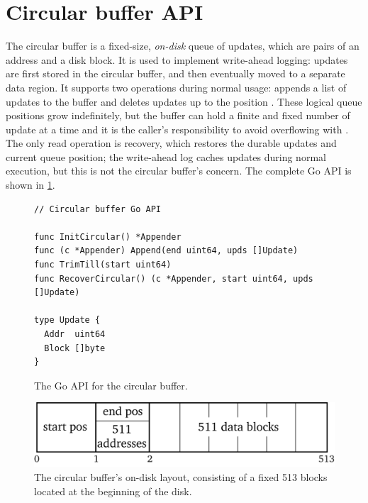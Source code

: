 \section{Circular buffer API}
\label{sec:circ-api}

The circular buffer is a fixed-size, \emph{on-disk} queue of
updates, which are pairs of an address and a disk block. It is used to implement
write-ahead logging: updates are first stored in the circular buffer, and
then eventually moved to a separate data region. It supports two operations
during normal usage:  appends a list of updates to the buffer
and  deletes updates up to the position . These logical queue positions grow
indefinitely, but the buffer can hold a finite and fixed number of update at a time and it
is the caller's responsibility to avoid overflowing with . The only
read operation is recovery, which restores the durable updates and current queue
position; the write-ahead log caches updates during normal execution, but this
is not the circular buffer's concern. The complete Go API is shown in
\cref{fig:circ:api}.

\begin{figure}[ht]
\begin{verbatim}
// Circular buffer Go API

func InitCircular() *Appender
func (c *Appender) Append(end uint64, upds []Update)
func TrimTill(start uint64)
func RecoverCircular() (c *Appender, start uint64, upds []Update)

type Update {
  Addr  uint64
  Block []byte
}
\end{verbatim}
  \tightenspace
  \caption{The Go API for the circular buffer.}%
  \label{fig:circ:api}
\end{figure}

\begin{figure}[ht]
  \includegraphics{fig/circ-phys.png}
  \caption[Circular buffer on-disk layout]%
  {The circular buffer's on-disk layout, consisting of a fixed 513 blocks
  located at the beginning of the disk.}
\label{fig:circ:phys}
\end{figure}

